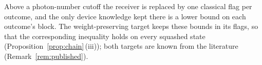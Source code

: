 
Above a photon-number cutoff the receiver is replaced by one classical flag
per outcome, and the only device knowledge kept there is a lower bound on each
outcome's block. The weight-preserving target keeps these bounds in its flags,
so that the corresponding inequality holds on every squashed state
(Proposition~\ref{prop:chain}\,(iii)); both targets are known from the
literature (Remark~\ref{rem:published}).

